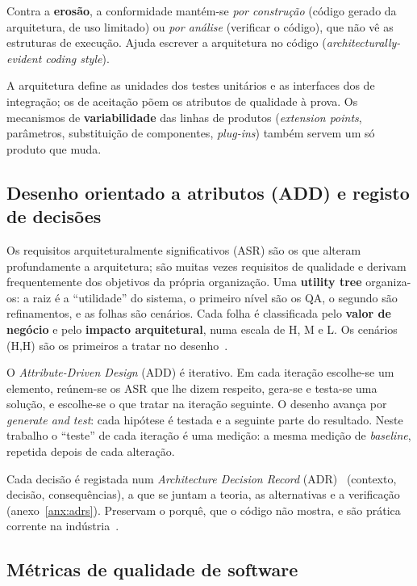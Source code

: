 Contra a \textbf{erosão}, a conformidade mantém-se \emph{por construção} (código gerado da arquitetura, de uso
limitado) ou \emph{por análise} (verificar o código), que não vê as estruturas de execução. Ajuda escrever a
arquitetura no código (\emph{architecturally-evident coding style}).

A arquitetura define as unidades dos testes unitários e as interfaces dos de integração; os de aceitação põem os
atributos de qualidade à prova. Os mecanismos de \textbf{variabilidade} das linhas de produtos (\emph{extension
points}, parâmetros, substituição de componentes, \emph{plug-ins}) também servem um só produto que muda.

\subsection{Desenho orientado a atributos (ADD) e registo de decisões}

Os requisitos arquiteturalmente significativos (ASR) são os que alteram profundamente a arquitetura; são
muitas vezes requisitos de qualidade e derivam frequentemente dos objetivos da própria organização. Uma
\textbf{utility tree} organiza-os: a raiz é a ``utilidade'' do sistema, o primeiro nível são os QA, o
segundo são refinamentos, e as folhas são cenários. Cada folha é classificada pelo
\textbf{valor de negócio} e pelo \textbf{impacto arquitetural}, numa escala de H, M e L. Os cenários (H,H)
são os primeiros a tratar no desenho~\cite{bastofernandes2026}.

O \emph{Attribute-Driven Design} (ADD) é iterativo. Em cada iteração escolhe-se um elemento, reúnem-se
os ASR que lhe dizem respeito, gera-se e testa-se uma solução, e escolhe-se o que tratar na iteração
seguinte. O desenho avança por \emph{generate and test}: cada hipótese é testada e a seguinte parte do
resultado. Neste trabalho o ``teste'' de cada iteração é uma medição: a mesma medição de \emph{baseline},
repetida depois de cada alteração.

Cada decisão é registada num \emph{Architecture Decision Record} (ADR)~\cite{nygard2011} (contexto, decisão,
consequências), a que se juntam a teoria, as alternativas e a verificação (anexo~\ref{anx:adrs}). Preservam o porquê,
que o código não mostra, e são prática corrente na
indústria~\cite{thoughtworks2017adr,kunce2022adr,microsoftadr}.

\subsection{Métricas de qualidade de software}

